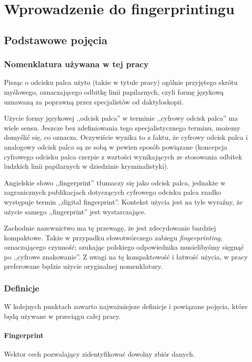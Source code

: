 \chapter{Wprowadzenie do fingerprintingu} %

\section{Podstawowe pojęcia}

\subsection{Nomenklatura używana w tej pracy}
Pisząc o odcisku palca użyto (także w tytule pracy) ogólnie przyjętego skrótu
myślowego, oznaczającego odbitkę linii papilarnych, czyli formę językową
uznawaną za poprawną przez specjalistów od daktyloskopii.

Użycie formy językowej ,,odcisk palca'' w terminie ,,cyfrowy odcisk palca'' ma
wiele sensu. Jeszcze bez zdefiniowania tego specjalistycznego terminu, możemy
domyślić się, co oznacza. Oczywiście wynika to z faktu, że cyfrowy odcisk palca
i analogowy odcisk palca są ze sobą w pewien sposób powiązane (koncepcja
cyfrowego odcisku palca czerpie z wartości wynikających ze stosowania odbitek
ludzkich linii papilarnych w dziedzinie kryminalistyki).

Angielskie słowo ,,fingerprint'' tłumaczy się jako odcisk palca, jednakże w
zagranicznych publikacjach dotyczących cyfrowego odcisku palca rzadko występuje
termin ,,digital fingerprint''. Kontekst użycia jest na tyle wyraźny, że użycie
samego ,,fingerprint'' jest wystarczające.

Zachodnie nazewnictwo ma tę przewagę, że jest zdecydowanie bardziej kompaktowe.
Także w przypadku słowotwórczego zabiegu \emph{fingerprinting}, oznaczającego
czynność; szukając polskiego odpowiednika musielibyśmy sięgnąć po ,,cyfrowe
znakowanie''. Z uwagi na tę kompaktowość i łatwość użycia, w pracy preferowane
będzie użycie oryginalnej nomenklatury.

\subsection{Definicje}
W kolejnych punktach zawarto najważniejsze definicje i powiązane pojęcia, które
będą używane w przeciągu całej pracy.

\subsubsection{Fingerprint}
Wektor cech pozwalający zidentyfikować dowolny zbiór danych.

